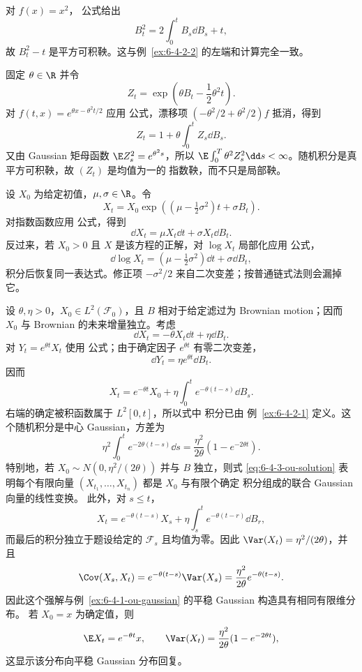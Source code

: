 \begin{example}[平方与指数]\label{ex:6-4-3-1}
对 $f(x)=x^2$，\Ito{} 公式给出
\[
 B_t^2=2\int_0^tB_s\dd B_s+t,
\]
故 $B_t^2-t$ 是平方可积鞅。这与例~\ref{ex:6-4-2-2} 的左端和计算完全一致。

固定 $\theta\in\R$ 并令
\[
 Z_t=\exp\!\left(\theta B_t-\frac12\theta^2t\right).
\]
对 $f(t,x)=e^{\theta x-\theta^2t/2}$ 应用 \Ito{} 公式，漂移项
$(-\theta^2/2+\theta^2/2)f$ 抵消，得到
\[
 Z_t=1+\theta\int_0^tZ_s\dd B_s.
\]
又由 Gaussian 矩母函数
$\E Z_s^2=e^{\theta^2s}$，所以
$\E\int_0^T\theta^2Z_s^2\dd s<\infty$。随机积分是真平方可积鞅，故 $(Z_t)$ 是均值为一的
指数鞅，而不只是局部鞅。
\end{example}

\begin{example}\label{ex:6-4-3-2}
设 $X_0$ 为给定初值，$\mu,\sigma\in\R$。令
\[
 X_t=X_0\exp\!\left((\mu-\tfrac12\sigma^2)t+\sigma B_t\right).
\]
对指数函数应用 \Ito{} 公式，得到
\[
 \dd X_t=\mu X_t\dd t+\sigma X_t\dd B_t.
\]
反过来，若 $X_0>0$ 且 $X$ 是该方程的正解，对 $\log X_t$ 局部化应用 \Ito{} 公式，
\[
 \dd\log X_t=(\mu-\tfrac12\sigma^2)\dd t+\sigma\dd B_t,
\]
积分后恢复同一表达式。修正项 $-\sigma^2/2$ 来自二次变差；按普通链式法则会漏掉它。
\end{example}

\begin{example}
\label{ex:6-4-3-ou-sde}
设 $\theta,\eta>0$，$X_0\in L^2(\mathcal F_0)$，且 $B$ 相对于给定滤过为 Brownian motion；因而 $X_0$ 与 Brownian 的未来增量独立。考虑
\[
 \dd X_t=-\theta X_t\dd t+\eta\dd B_t.
\]
对 $Y_t=e^{\theta t}X_t$ 使用 \Ito{} 公式；由于确定因子 $e^{\theta t}$ 有零二次变差，
\[
 \dd Y_t=\eta e^{\theta t}\dd B_t.
\]
因而
\begin{equation}\label{eq:6-4-3-ou-solution}
 X_t=e^{-\theta t}X_0
 +\eta\int_0^te^{-\theta(t-s)}\dd B_s.
\end{equation}
右端的确定被积函数属于 $L^2[0,t]$，所以式中 \Ito{} 积分已由
例~\ref{ex:6-4-2-1} 定义。这个随机积分是中心 Gaussian，方差为
\[
 \eta^2\int_0^te^{-2\theta(t-s)}\dd s
 =\frac{\eta^2}{2\theta}(1-e^{-2\theta t}).
\]
特别地，若 $X_0\sim N(0,\eta^2/(2\theta))$ 并与 $B$ 独立，则式
\eqref{eq:6-4-3-ou-solution} 表明每个有限向量
$(X_{t_1},\ldots,X_{t_n})$ 都是 $X_0$ 与有限个确定 \Ito{} 积分组成的联合 Gaussian 向量的线性变换。
此外，对 $s\le t$，
\[
 X_t=e^{-\theta(t-s)}X_s
 +\eta\int_s^te^{-\theta(t-r)}\dd B_r,
\]
而最后的积分独立于题设给定的 $\mathcal F_s$ 且均值为零。因此
$\Var(X_t)=\eta^2/(2\theta)$，并且
\[
 \Cov(X_s,X_t)=e^{-\theta(t-s)}\Var(X_s)
 =\frac{\eta^2}{2\theta}e^{-\theta(t-s)}.
\]
因此这个强解与例~\ref{ex:6-4-1-ou-gaussian} 的平稳 Gaussian 构造具有相同有限维分布。
若 $X_0=x$ 为确定值，则
\[
 \E X_t=e^{-\theta t}x,\qquad
 \Var(X_t)=\frac{\eta^2}{2\theta}(1-e^{-2\theta t}),
\]
这显示该分布向平稳 Gaussian 分布回复。
\end{example}

